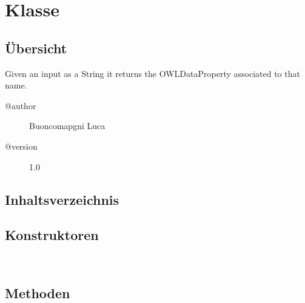 
\section[AsOWLDataProperty]{Klasse }\label{ontologyFramework.OFEventManagement.OFEventParameter.AsOWLDataProperty-class}
\subsection{Übersicht}
Given an input as a String it returns the OWLDataProperty associated to that name.
\begin{description}
\item[@author] 
Buoncomapgni Luca
\item[@version] 
1.0
\end{description}
\subsection{Inhaltsverzeichnis}
\subsection{Konstruktoren}
\begin{description}
\item[{\label{ontologyFramework.OFEventManagement.OFEventParameter.AsOWLDataProperty()}}]
~ 
\end{description}
\subsection{Methoden}
\begin{description}
\item[{\label{ontologyFramework.OFEventManagement.OFEventParameter.AsOWLDataProperty.getParameter(java.lang.Object,ontologyFramework.OFContextManagement.OWLReferences)}}]
~ 
\end{description}
